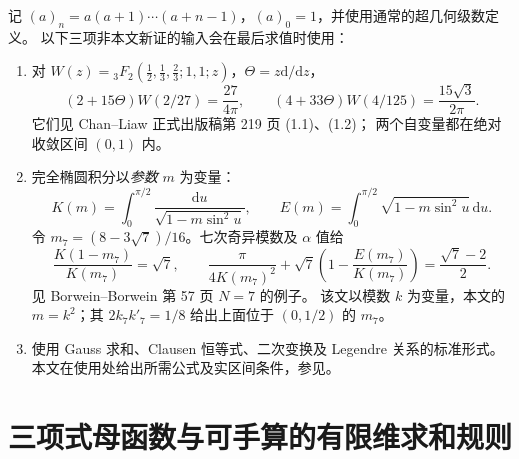 \documentclass[11pt,a4paper]{article}
\numberwithin{equation}{section}
\theoremstyle{remark}\newtheorem{remark}[theorem]{说明}
\newcommand{\dd}{\mathrm d}
\begin{document}
记 $(a)_n=a(a+1)\cdots(a+n-1)$，$(a)_0=1$，并使用通常的超几何级数定义。
以下三项非本文新证的输入会在最后求值时使用：
\begin{enumerate}[label=(C\arabic*),leftmargin=3em]
\item 对 $W(z)={}_3F_2(\tfrac12,\tfrac13,\tfrac23;1,1;z)$，$\Theta=z\dd/\dd z$，
\begin{equation}\label{eq:classic12}
 (2+15\Theta)W(2/27)=\frac{27}{4\pi},\qquad
 (4+33\Theta)W(4/125)=\frac{15\sqrt3}{2\pi}.
\end{equation}
它们见 Chan--Liaw 正式出版稿第 219 页 (1.1)、(1.2)\cite{ChanLiaw}；
两个自变量都在绝对收敛区间 $(0,1)$ 内。
\item 完全椭圆积分以\emph{参数} $m$ 为变量：
\begin{equation}\label{eq:KEdef}
 K(m)=\int_0^{\pi/2}\frac{\dd u}{\sqrt{1-m\sin^2u}},\qquad
 E(m)=\int_0^{\pi/2}\sqrt{1-m\sin^2u}\,\dd u.
\end{equation}
令 $m_7=(8-3\sqrt7)/16$。七次奇异模数及 $\alpha$ 值给
\begin{equation}\label{eq:CM}
 \frac{K(1-m_7)}{K(m_7)}=\sqrt7,\qquad
 \frac{\pi}{4K(m_7)^2}+\sqrt7\left(1-\frac{E(m_7)}{K(m_7)}\right)
 =\frac{\sqrt7-2}{2}.
\end{equation}
见 Borwein--Borwein 第 57 页 $N=7$ 的例子\cite{Borwein}。
该文以模数 $k$ 为变量，本文的 $m=k^2$；其 $2k_7k'_7=1/8$
给出上面位于 $(0,1/2)$ 的 $m_7$。
\item 使用 Gauss 求和、Clausen 恒等式、二次变换及 Legendre 关系的标准形式。
本文在使用处给出所需公式及实区间条件，参见\cite{DLMF15,DLMF16,DLMF19}。
\end{enumerate}

\section{三项式母函数与可手算的有限维求和规则}
\end{document}
